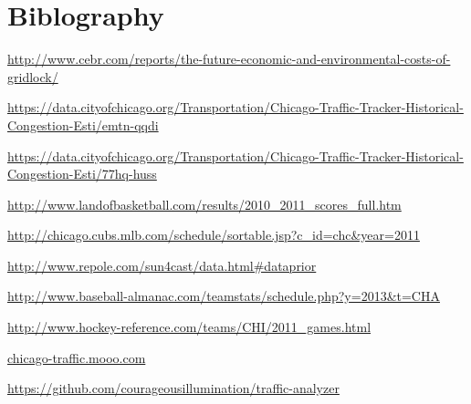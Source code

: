 \documentclass[12pt]{article}
\begin{document}
\section{Biblography}
\begin{thebibliography}{9}

  \url{http://www.cebr.com/reports/the-future-economic-and-environmental-costs-of-gridlock/}

  \url{https://data.cityofchicago.org/Transportation/Chicago-Traffic-Tracker-Historical-Congestion-Esti/emtn-qqdi}
  
  \url{https://data.cityofchicago.org/Transportation/Chicago-Traffic-Tracker-Historical-Congestion-Esti/77hq-huss}

  \url{http://www.landofbasketball.com/results/2010_2011_scores_full.htm}

  \url{http://chicago.cubs.mlb.com/schedule/sortable.jsp?c_id=chc&year=2011}

  \url{http://www.repole.com/sun4cast/data.html#dataprior}
	
  \url{http://www.baseball-almanac.com/teamstats/schedule.php?y=2013&t=CHA}

  \url{http://www.hockey-reference.com/teams/CHI/2011_games.html}
  
  \url{chicago-traffic.mooo.com}
  
  \url{https://github.com/courageousillumination/traffic-analyzer}

\end{thebibliography}
\end{document}
